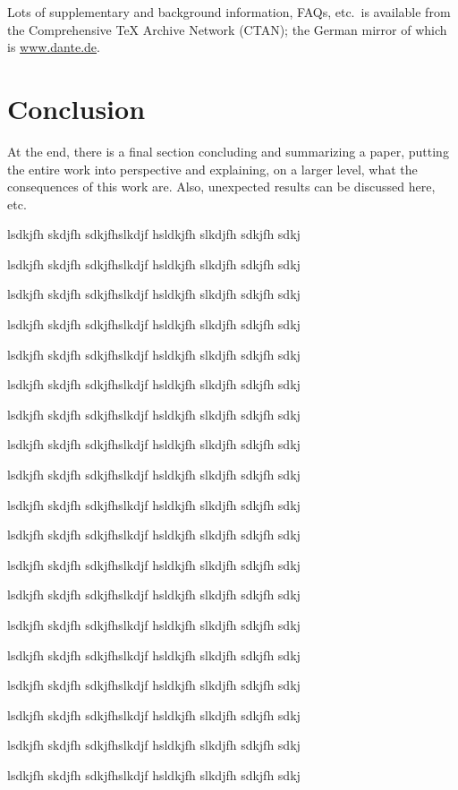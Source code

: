 \documentclass[12pt,twoside,doublepage]{article}
\begin{document}
Lots of supplementary and background information, FAQs, etc.\ is
available from the Comprehensive TeX Archive Network (CTAN); the
German mirror of which is \url{www.dante.de}. 

\section{Conclusion}
\label{sec:concl}

At the end, there is a final section concluding and summarizing a
paper, putting the entire work into perspective and explaining, on a
larger level, what the consequences of this work are. Also, unexpected
results can be discussed here, etc.


lsdkjfh skdjfh sdkjfhslkdjf hsldkjfh slkdjfh sdkjfh sdkj

lsdkjfh skdjfh sdkjfhslkdjf hsldkjfh slkdjfh sdkjfh sdkj

lsdkjfh skdjfh sdkjfhslkdjf hsldkjfh slkdjfh sdkjfh sdkj

lsdkjfh skdjfh sdkjfhslkdjf hsldkjfh slkdjfh sdkjfh sdkj

lsdkjfh skdjfh sdkjfhslkdjf hsldkjfh slkdjfh sdkjfh sdkj

lsdkjfh skdjfh sdkjfhslkdjf hsldkjfh slkdjfh sdkjfh sdkj

lsdkjfh skdjfh sdkjfhslkdjf hsldkjfh slkdjfh sdkjfh sdkj

lsdkjfh skdjfh sdkjfhslkdjf hsldkjfh slkdjfh sdkjfh sdkj

lsdkjfh skdjfh sdkjfhslkdjf hsldkjfh slkdjfh sdkjfh sdkj

lsdkjfh skdjfh sdkjfhslkdjf hsldkjfh slkdjfh sdkjfh sdkj

lsdkjfh skdjfh sdkjfhslkdjf hsldkjfh slkdjfh sdkjfh sdkj

lsdkjfh skdjfh sdkjfhslkdjf hsldkjfh slkdjfh sdkjfh sdkj

lsdkjfh skdjfh sdkjfhslkdjf hsldkjfh slkdjfh sdkjfh sdkj

lsdkjfh skdjfh sdkjfhslkdjf hsldkjfh slkdjfh sdkjfh sdkj

lsdkjfh skdjfh sdkjfhslkdjf hsldkjfh slkdjfh sdkjfh sdkj

lsdkjfh skdjfh sdkjfhslkdjf hsldkjfh slkdjfh sdkjfh sdkj

lsdkjfh skdjfh sdkjfhslkdjf hsldkjfh slkdjfh sdkjfh sdkj

lsdkjfh skdjfh sdkjfhslkdjf hsldkjfh slkdjfh sdkjfh sdkj

lsdkjfh skdjfh sdkjfhslkdjf hsldkjfh slkdjfh sdkjfh sdkj
\end{document}
